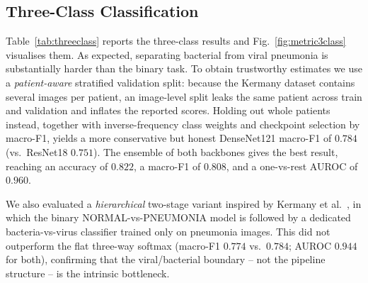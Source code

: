 \documentclass[runningheads]{llncs}
\begin{document}
\subsection{Three-Class Classification}

Table~\ref{tab:threeclass} reports the three-class results and
Fig.~\ref{fig:metric3class} visualises them. As expected, separating
bacterial from viral pneumonia is substantially harder than the binary
task. To obtain trustworthy estimates we use a \emph{patient-aware}
stratified validation split: because the Kermany dataset contains several
images per patient, an image-level split leaks the same patient across
train and validation and inflates the reported scores. Holding out whole
patients instead, together with inverse-frequency class weights and
checkpoint selection by macro-F1, yields a more conservative but honest
DenseNet121 macro-F1 of $0.784$ (vs.\ ResNet18 $0.751$). The ensemble of
both backbones gives the best result, reaching an accuracy of $0.822$, a
macro-F1 of $0.808$, and a one-vs-rest AUROC of $0.960$.

We also evaluated a \emph{hierarchical} two-stage variant inspired by
Kermany et al.~\cite{ref_kermany}, in which the binary NORMAL-vs-PNEUMONIA
model is followed by a dedicated bacteria-vs-virus classifier trained only
on pneumonia images. This did not outperform the flat three-way softmax
(macro-F1 $0.774$ vs.\ $0.784$; AUROC $0.944$ for both), confirming that the
viral/bacterial boundary -- not the pipeline structure -- is the intrinsic
bottleneck.

\begin{table}[!ht]
\caption{Three-class classification (NORMAL / BACTERIA / VIRUS) on the
test set, mean\,$\pm$\,std over seeds $\{0,1,2\}$ (single models) or
deterministic for the ensemble. Macro-averaged metrics. Best in
\textbf{bold}.}
\label{tab:threeclass}
\centering
\setlength{\tabcolsep}{4pt}
\end{table}
\end{document}
